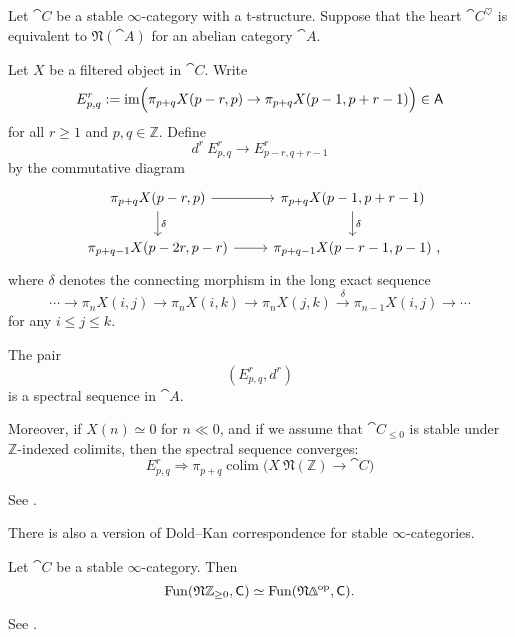 Let $\cat{C}$ be a stable $\infty$-category with a t-structure.
Suppose that the heart $\cat{C}^\heartsuit$ 
is equivalent to $\mathfrak{N}(\cat{A})$ for an abelian category $\cat{A}$.

Let $X$ be a filtered object in $\cat{C}$.
Write
\[E^r_{p,q}:=\operatorname{im}\Bigl(
    \pi_{p+q}X(p-r,p)\to\pi_{p+q}X(p-1,p+r-1)
\Bigr)\in\mathsf{A}\]
for all $r\geq1$ and $p,q\in\mathbb{Z}$.
Define 
\[d^r\:E^r_{p,q}\to E^r_{p-r,q+r-1}\]
by the commutative diagram 
\[\begin{tikzcd}
    \pi_{p+q}X(p-r,p)\ar[r]\ar[d,"\delta"] & \pi_{p+q}X(p-1,p+r-1)\ar[d,"\delta"] \\
    \pi_{p+q-1}X(p-2r,p-r)\ar[r] & \pi_{p+q-1}X(p-r-1,p-1)\rlap{\ ,}
\end{tikzcd}\]
where $\delta$ denotes the connecting morphism in the long exact sequence 
\[\cdots\to\pi_nX(i,j)\to\pi_nX(i,k)\to\pi_nX(j,k)\xrightarrow{\delta}\pi_{n-1}X(i,j)\to\cdots\]
for any $i\leq j\leq k$.

\begin{theorem}
    The pair 
    \[ (E^r_{p,q},d^r) \]
    is a spectral sequence in $\cat{A}$.

    Moreover, if $X(n)\simeq0$ for $n\ll0$, 
    and if we assume that $\cat{C}_{\leq0}$
    is stable under $\mathbb{Z}$-indexed colimits,
    then the spectral sequence converges:
    \[ E^r_{p,q}\Rightarrow\pi_{p+q}\operatorname{colim}
    \bigl(X\:\mathfrak{N}(\mathbb{Z})\to\cat{C}\bigr) \]
\end{theorem}

See \cite[Propositions 1.2.2.7~and~1.2.2.14]{ha}.

There is also a version of Dold--Kan correspondence
for stable $\infty$-categories.

\begin{theorem}
    Let $\cat{C}$ be a stable $\infty$-category. Then 
    \[\operatorname{Fun}(\mathfrak{N}\mathbb{Z}_{\geq0},\cat{C})
    \simeq\operatorname{Fun}(\mathfrak{N}\bfDelta\op,\cat{C}).\]
\end{theorem}

See \cite[Theorem~1.2.4.1]{ha}.
